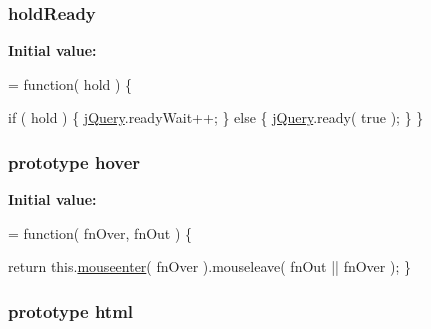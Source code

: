 \hypertarget{jquery-1_810_82-vsdoc_8js_a551f58116e29e1744dd3bea8e611eb9f}{
\subsubsection[{hold\-Ready}]{ hold\-Ready}}\label{jquery-1_810_82-vsdoc_8js_a551f58116e29e1744dd3bea8e611eb9f}
{\bfseries Initial value\-:}
\begin{DoxyCode}
= \textcolor{keyword}{function}( hold ) \{


        \textcolor{keywordflow}{if} ( hold ) \{
            \hyperlink{jquery-1_810_82-vsdoc_8js_add5237586d970a38a81f990e8eb28c6c}{jQuery}.readyWait++;
        \} \textcolor{keywordflow}{else} \{
            \hyperlink{jquery-1_810_82-vsdoc_8js_add5237586d970a38a81f990e8eb28c6c}{jQuery}.ready( \textcolor{keyword}{true} );
        \}
    \}
\end{DoxyCode}
\hypertarget{jquery-1_810_82-vsdoc_8js_a89022f117a4ab5bd5f578a26a7eaafa5}{
\subsubsection[{hover}]{ {\bf prototype} hover}}\label{jquery-1_810_82-vsdoc_8js_a89022f117a4ab5bd5f578a26a7eaafa5}
{\bfseries Initial value\-:}
\begin{DoxyCode}
= \textcolor{keyword}{function}( fnOver, fnOut ) \{


        \textcolor{keywordflow}{return} this.\hyperlink{jquery-1_810_82-vsdoc_8js_a762f67ea0a9dd89f27dbe2b23d9f91b9}{mouseenter}( fnOver ).mouseleave( fnOut || fnOver );
    \}
\end{DoxyCode}
\hypertarget{jquery-1_810_82-vsdoc_8js_a54a716632718016dd4e400e83a0970e2}{
\subsubsection[{html}]{ {\bf prototype} html}}\label{jquery-1_810_82-vsdoc_8js_a54a716632718016dd4e400e83a0970e2}
